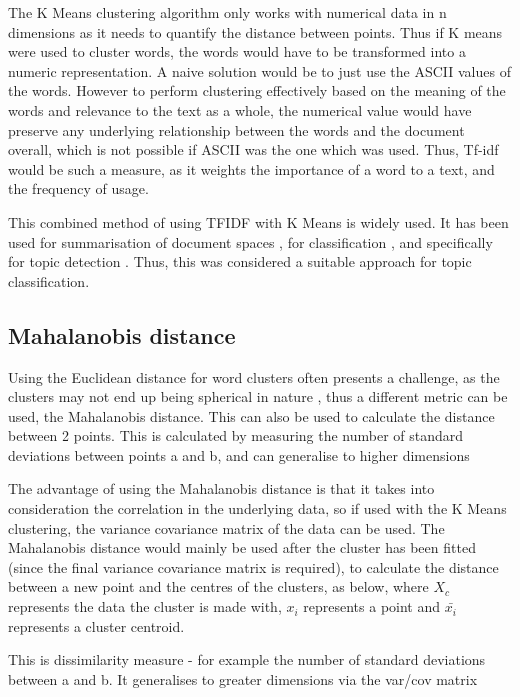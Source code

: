 The K Means clustering algorithm only works with numerical data in n dimensions as it needs to quantify the distance between points. Thus if K means were used to cluster words, the words would have to be transformed into a numeric representation. A naive solution would be to just use the ASCII values of the words. However to perform clustering effectively based on the meaning of the words and relevance to the text as a whole, the numerical value would have preserve any underlying relationship between the words and the document overall, which is not possible if ASCII was the one which was used. Thus, Tf-idf would be such a measure, as it weights the importance of a word to a text, and the frequency of usage. 

This combined method of using TFIDF with K Means is widely used. It has been used for summarisation of document spaces \cite{khan2019extractive}, for classification \cite{buana2012combination}, and specifically for topic detection \cite{6066301}. Thus, this was considered a suitable approach for topic classification.

\subsection{Mahalanobis distance}

Using the Euclidean distance for word clusters often presents a challenge, as the clusters may not end up being spherical in nature \cite{raykov2016k}, thus a different metric can be used, the Mahalanobis distance. This can also be used to calculate the distance between 2 points. This is calculated by measuring the number of standard deviations between points a and b, and can generalise to higher dimensions 

The advantage of using the Mahalanobis distance is that it takes into consideration the correlation in the underlying data, so if used with the K Means clustering, the variance covariance matrix of the data can be used. The Mahalanobis distance would mainly be used after the cluster has been fitted (since the final variance covariance matrix is required), to calculate the distance between a new point and the centres of the clusters, as below, where $X_{c}$ represents the data the cluster is made with, $x_{i}$ represents a point and $\bar{x_{i}}$ represents a cluster centroid.  


This is dissimilarity measure - for example the number of standard deviations between a and b. It generalises to greater dimensions via the var/cov matrix

